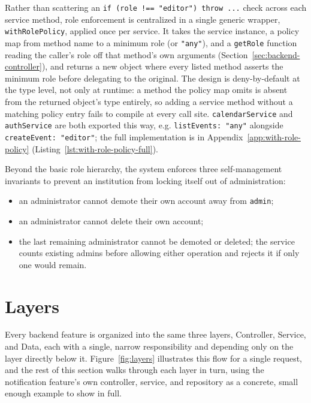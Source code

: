 Rather than scattering an \texttt{if (role !== "editor") throw ...} check across each service method, role enforcement is centralized in a single generic wrapper, \texttt{withRolePolicy}, applied once per service. It takes the service instance, a policy map from method name to a minimum role (or \texttt{"any"}), and a \texttt{getRole} function reading the caller's role off that method's own arguments (Section~\ref{sec:backend-controller}), and returns a new object where every listed method asserts the minimum role before delegating to the original. The design is deny-by-default at the type level, not only at runtime: a method the policy map omits is absent from the returned object's type entirely, so adding a service method without a matching policy entry fails to compile at every call site. \texttt{calendarService} and \texttt{authService} are both exported this way, e.g. \texttt{listEvents: "any"} alongside \texttt{createEvent: "editor"}; the full implementation is in Appendix~\ref{app:with-role-policy} (Listing~\ref{lst:with-role-policy-full}).

Beyond the basic role hierarchy, the system enforces three self-management invariants to prevent an institution from locking itself out of administration:
\begin{itemize}
    \item an administrator cannot demote their own account away from \texttt{admin};
    \item an administrator cannot delete their own account;
    \item the last remaining administrator cannot be demoted or deleted; the service counts existing admins before allowing either operation and rejects it if only one would remain.
\end{itemize}

\section{Layers} \label{sec:backend-layers}

Every backend feature is organized into the same three layers, Controller, Service, and Data, each with a single, narrow responsibility and depending only on the layer directly below it. Figure~\ref{fig:layers} illustrates this flow for a single request, and the rest of this section walks through each layer in turn, using the notification feature's own controller, service, and repository as a concrete, small enough example to show in full.


